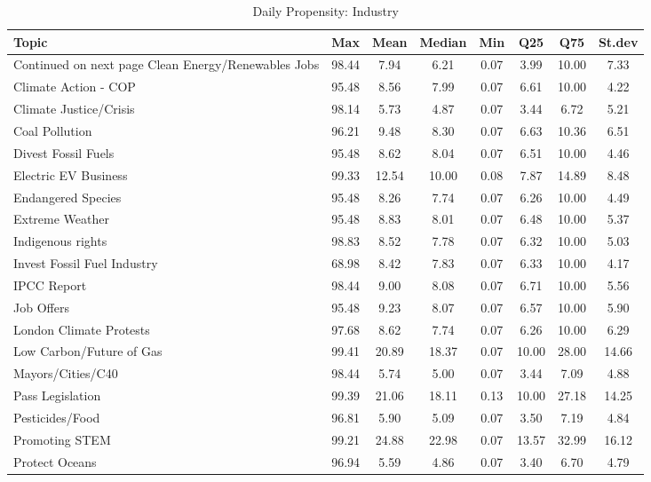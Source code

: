 \begin{longtable}{L|ccccccc}
\caption{Daily Propensity: Industry} \\ 
  \hline
Topic & Max & Mean & Median & Min & Q25 & Q75 & St.dev \\ 
  \hline 
\endhead 
\hline 
{\footnotesize Continued on next page} 
\endfoot 
\endlastfoot 
Clean Energy/Renewables Jobs & 98.44 & 7.94 & 6.21 & 0.07 & 3.99 & 10.00 & 7.33 \\ 
  Climate Action - COP & 95.48 & 8.56 & 7.99 & 0.07 & 6.61 & 10.00 & 4.22 \\ 
  Climate Justice/Crisis & 98.14 & 5.73 & 4.87 & 0.07 & 3.44 & 6.72 & 5.21 \\ 
  Coal Pollution & 96.21 & 9.48 & 8.30 & 0.07 & 6.63 & 10.36 & 6.51 \\ 
  Divest Fossil Fuels & 95.48 & 8.62 & 8.04 & 0.07 & 6.51 & 10.00 & 4.46 \\ 
  Electric EV Business & 99.33 & 12.54 & 10.00 & 0.08 & 7.87 & 14.89 & 8.48 \\ 
  Endangered Species & 95.48 & 8.26 & 7.74 & 0.07 & 6.26 & 10.00 & 4.49 \\ 
  Extreme Weather & 95.48 & 8.83 & 8.01 & 0.07 & 6.48 & 10.00 & 5.37 \\ 
  Indigenous rights & 98.83 & 8.52 & 7.78 & 0.07 & 6.32 & 10.00 & 5.03 \\ 
  Invest Fossil Fuel Industry & 68.98 & 8.42 & 7.83 & 0.07 & 6.33 & 10.00 & 4.17 \\ 
  IPCC Report & 98.44 & 9.00 & 8.08 & 0.07 & 6.71 & 10.00 & 5.56 \\ 
  Job Offers & 95.48 & 9.23 & 8.07 & 0.07 & 6.57 & 10.00 & 5.90 \\ 
  London Climate Protests & 97.68 & 8.62 & 7.74 & 0.07 & 6.26 & 10.00 & 6.29 \\ 
  Low Carbon/Future of Gas & 99.41 & 20.89 & 18.37 & 0.07 & 10.00 & 28.00 & 14.66 \\ 
  Mayors/Cities/C40 & 98.44 & 5.74 & 5.00 & 0.07 & 3.44 & 7.09 & 4.88 \\ 
  Pass Legislation & 99.39 & 21.06 & 18.11 & 0.13 & 10.00 & 27.18 & 14.25 \\ 
  Pesticides/Food & 96.81 & 5.90 & 5.09 & 0.07 & 3.50 & 7.19 & 4.84 \\ 
  Promoting STEM & 99.21 & 24.88 & 22.98 & 0.07 & 13.57 & 32.99 & 16.12 \\ 
  Protect Oceans & 96.94 & 5.59 & 4.86 & 0.07 & 3.40 & 6.70 & 4.79 \\ 

\end{longtable}
